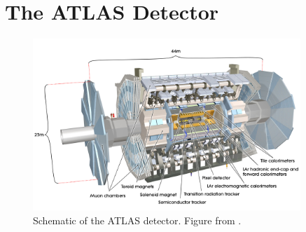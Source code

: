 \section{The ATLAS Detector}

\begin{figure}
\centering
\includegraphics[width=0.9\textwidth]{figures/Detector/AtlasDetector.jpg}
  \caption[The ATLAS Detector]{
Schematic of the ATLAS detector.
Figure from \cite{ref:ATLASExp}.
}
\label{Det:ATLAS}
\end{figure}

